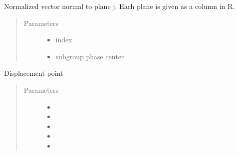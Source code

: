 \documentclass[letterpaper,10pt,english]{sphinxmanual}
\begin{document}
\begin{fulllineitems}
\label{\detokenize{functions:functions.nvec_j}}
Normalized vector normal to plane j. Each plane is given as a column in R.
\begin{quote}\begin{description}
\item[{Parameters}] \leavevmode\begin{itemize}
\item {} 
 \textendash{} index

\item {} 
 \textendash{} subgroup phase center

\end{itemize}

\end{description}\end{quote}

\end{fulllineitems}


\begin{fulllineitems}
\label{\detokenize{functions:functions.p0_jk}}
Displacement point
\begin{quote}\begin{description}
\item[{Parameters}] \leavevmode\begin{itemize}
\item {} 
 \textendash{} 

\item {} 
 \textendash{} 

\item {} 
 \textendash{} 

\item {} 
 \textendash{} 

\item {} 
 \textendash{} 

\end{itemize}

\end{description}\end{quote}

\end{fulllineitems}
\end{document}
